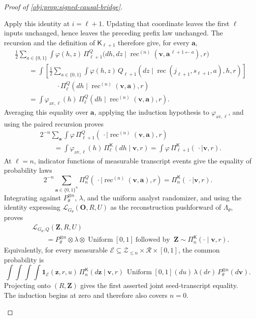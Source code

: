 \begin{proof}[Proof of \cref{obj:prop:signed-causal-bridge}]
\begin{enumerate}
Apply this identity at \(i=\ell+1\). Updating that coordinate leaves the
first \(\ell\) inputs unchanged, hence leaves the preceding prefix law
unchanged. The recursion and the definition of \(\mathsf K_{\ell+1}\)
therefore give, for every \(\mathbf a\),
\[
\begin{aligned}
&\frac12\sum_{a\in\{0,1\}}
 \int\varphi(h,z)\,
 \Pi_{\ell+1}^Q
 \bigl(dh,dz\mid
 \operatorname{rec}^{(n)}
   (\mathbf v,\mathbf a^{\,\ell+1\leftarrow a}),r\bigr)\\
&\qquad=
 \int\left[
 \frac12\sum_{a\in\{0,1\}}
 \int\varphi(h,z)\,
 Q_{\ell+1}(dz\mid
 \operatorname{rec}(j_{\ell+1},s_{\ell+1},a),h,r)
 \right]\\
&\hspace{6em}\cdot
 \Pi_\ell^Q(dh\mid
 \operatorname{rec}^{(n)}(\mathbf v,\mathbf a),r)\\
&\qquad=
 \int\varphi_{\mathrm{av},\ell}(h)\,
 \Pi_\ell^Q(dh\mid
 \operatorname{rec}^{(n)}(\mathbf v,\mathbf a),r).
\end{aligned}
\]
Averaging this equality over \(\mathbf a\), applying the induction
hypothesis to \(\varphi_{\mathrm{av},\ell}\), and using the paired
recursion proves
\[
\begin{aligned}
&2^{-n}\sum_{\mathbf a}
 \int\varphi\,
 \Pi_{\ell+1}^Q
 (\,\cdot\mid\operatorname{rec}^{(n)}(\mathbf v,\mathbf a),r)\\
&\qquad=
 \int\varphi_{\mathrm{av},\ell}(h)\,
 \Pi_\ell^{\mathsf K}(dh\mid\mathbf v,r)
 =\int\varphi\,\Pi_{\ell+1}^{\mathsf K}
 (\,\cdot\mid\mathbf v,r).
\end{aligned}
\]
At \(\ell=n\), indicator functions of measurable transcript events give
the equality of probability laws
\[
2^{-n}\sum_{\mathbf a\in\{0,1\}^n}
\Pi_n^Q
(\,\cdot\mid\operatorname{rec}^{(n)}(\mathbf v,\mathbf a),r)
=\Pi_n^{\mathsf K}(\,\cdot\mid\mathbf v,r).
\]
Integrating against \(P_\theta^{\otimes n}\), \(\lambda\), and the uniform
analyst randomizer, and using the identity expressing
\(\mathcal L_{G_\theta}(\mathbf O,R,U)\) as the reconstruction
pushforward of \(\Lambda_\theta\), proves
\[
\begin{aligned}
&\mathcal L_{G_\theta,Q}(\mathbf Z,R,U)\\
&\qquad=
P_\theta^{\otimes n}\otimes\lambda
 \otimes\operatorname{Uniform}[0,1]
\ \text{followed by }\ 
\mathbf Z\sim\Pi_n^{\mathsf K}(\cdot\mid\mathbf v,r).
\end{aligned}
\]
Equivalently, for every measurable
\(\mathcal E\subseteq\mathcal Z_{\le n}\times\mathcal R\times[0,1]\),
the common probability is
\[
\int\!\int\!\int\!\int
\mathbf1_{\mathcal E}(\mathbf z,r,u)\,
\Pi_n^{\mathsf K}(d\mathbf z\mid\mathbf v,r)\,
\operatorname{Uniform}[0,1](du)\,
\lambda(dr)\,P_\theta^{\otimes n}(d\mathbf v).
\]
Projecting onto \((R,\mathbf Z)\) gives the first asserted joint
seed-transcript equality. The induction begins at zero and therefore
also covers \(n=0\).


\end{enumerate}
\end{proof}
